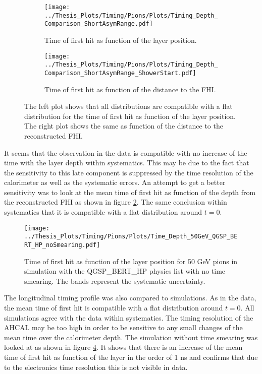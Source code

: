\begin{figure}[htbp!]
	\begin{subfigure}[t]{0.5\textwidth}
		\centering
		\texttt{[image: ../Thesis\_Plots/Timing/Pions/Plots/Timing\_Depth\_Comparison\_ShortAsymRange.pdf]}
		\caption{Time of first hit as function of the layer position.} \label{fig:Depth_Comparison}
	\end{subfigure}
	\hfill
	\begin{subfigure}[t]{0.5\textwidth}
		\centering
		\texttt{[image: ../Thesis\_Plots/Timing/Pions/Plots/Timing\_Depth\_Comparison\_ShortAsymRange\_ShowerStart.pdf]}
		\caption{Time of first hit as function of the distance to the FHI.}\label{fig:Depth_Comparison_FHI}
	\end{subfigure}
	\caption{The left plot shows that all distributions are compatible with a flat distribution for the time of first hit as function of the layer position. The right plot shows the same as function of the distance to the reconstructed FHI.}
	\label{fig:DepthProfile}
\end{figure}

It seems that the observation in the data is compatible with no increase of the time with the layer depth within systematics. This may be due to the fact that the sensitivity to this late component is suppressed by the time resolution of the calorimeter as well as the systematic errors. An attempt to get a better sensitivity was to look at the mean time of first hit as function of the depth from the reconstructed FHI as shown in figure \ref{fig:Depth_Comparison_FHI}. The same conclusion within systematics that it is compatible with a flat distribution around $t=0$.

\begin{figure}[htbp!]
	\centering
	\texttt{[image: ../Thesis\_Plots/Timing/Pions/Plots/Time\_Depth\_50GeV\_QGSP\_BERT\_HP\_noSmearing.pdf]}
	\caption{Time of first hit as function of the layer position for 50 GeV pions in simulation with the QGSP\_BERT\_HP physics list with no time smearing. The bands represent the systematic uncertainty.}
	\label{fig:Depth_Sim_noSmearing}
\end{figure}

The longitudinal timing profile was also compared to simulations. As in the data, the mean time of first hit is compatible with a flat distribution around $t=0$. All simulations agree with the data within systematics. The timing resolution of the AHCAL may be too high in order to be sensitive to any small changes of the mean time over the calorimeter depth. The simulation without time smearing was looked at as shown in figure \ref{fig:Depth_Sim_noSmearing}. It shows that there is an increase of the mean time of first hit as function of the layer in the order of 1 ns and confirms that due to the electronics time resolution this is not visible in data.

